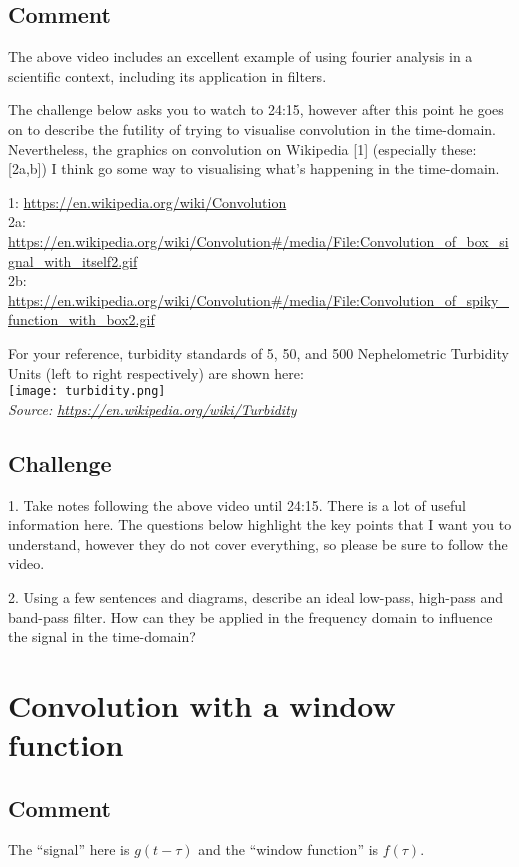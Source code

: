 \subsection*{Comment}
The above video includes an excellent example of using fourier analysis in a scientific context, including its application in filters.

The challenge below asks you to watch to 24:15, however after this point he goes on to describe the futility of trying to visualise convolution in the time-domain. Nevertheless, the graphics on convolution on Wikipedia [1] (especially these: [2a,b]) I think go some way to visualising what's happening in the time-domain.

1: \url{https://en.wikipedia.org/wiki/Convolution}\\
2a: \url{https://en.wikipedia.org/wiki/Convolution\#/media/File:Convolution_of_box_signal_with_itself2.gif}\\
2b: \url{https://en.wikipedia.org/wiki/Convolution\#/media/File:Convolution_of_spiky_function_with_box2.gif}

For your reference, turbidity standards of 5, 50, and 500 Nephelometric Turbidity Units (left to right respectively) are shown here:\\
\texttt{[image: turbidity.png]}\\
\emph{Source: \url{https://en.wikipedia.org/wiki/Turbidity}}

\subsection*{Challenge}
1. Take notes following the above video until 24:15. There is a lot of useful information here. The questions below highlight the key points that I want you to understand, however they do not cover everything, so please be sure to follow the video.

2. Using a few sentences and diagrams, describe an ideal low-pass, high-pass and band-pass filter. How can they be applied in the frequency domain to influence the signal in the time-domain?




\newpage
\section{Convolution with a window function}

\subsection*{Comment}
The ``signal'' here is $g(t-\tau)$ and the ``window function'' is $f(\tau)$.

